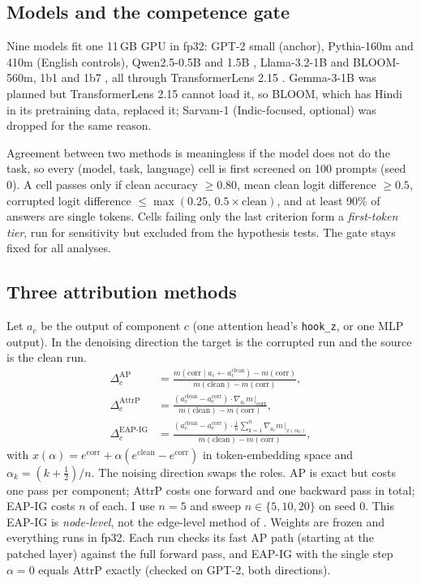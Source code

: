 \documentclass[10pt,a4paper]{article}
\newcommand{\AP}{\mathrm{AP}}
\newcommand{\AttrP}{\mathrm{AttrP}}
\begin{document}
\subsection{Models and the competence gate}
Nine models fit one 11\,GB GPU in fp32: GPT-2 small (anchor), Pythia-160m and 410m \citep{biderman2023pythia} (English controls), Qwen2.5-0.5B and 1.5B \citep{qwen2024qwen25}, Llama-3.2-1B \citep{llama2024herd} and BLOOM-560m, 1b1 and 1b7 \citep{workshop2022bloom}, all through TransformerLens 2.15 \citep{nanda2022transformerlens}. Gemma-3-1B was planned but TransformerLens 2.15 cannot load it, so BLOOM, which has Hindi in its pretraining data, replaced it; Sarvam-1 (Indic-focused, optional) was dropped for the same reason.

Agreement between two methods is meaningless if the model does not do the task, so every (model, task, language) cell is first screened on 100 prompts (seed 0). A cell passes only if clean accuracy $\ge0.80$, mean clean logit difference $\ge0.5$, corrupted logit difference $\le\max(0.25,\,0.5\times\text{clean})$, and at least 90\% of answers are single tokens. Cells failing only the last criterion form a \emph{first-token tier}, run for sensitivity but excluded from the hypothesis tests. The gate stays fixed for all analyses.

\subsection{Three attribution methods}
Let $a_c$ be the output of component $c$ (one attention head's \texttt{hook\_z}, or one MLP output). In the denoising direction the target is the corrupted run and the source is the clean run.
\begin{align}
\Delta_c^{\AP} &= \frac{m(\text{corr}\mid a_c\leftarrow a_c^{\text{clean}})-m(\text{corr})}{m(\text{clean})-m(\text{corr})},\\
\Delta_c^{\AttrP} &= \frac{(a_c^{\text{clean}}-a_c^{\text{corr}})\cdot\nabla_{a_c}m\,\big|_{\text{corr}}}{m(\text{clean})-m(\text{corr})},\\
\Delta_c^{\text{EAP-IG}} &= \frac{(a_c^{\text{clean}}-a_c^{\text{corr}})\cdot\frac1n\sum_{k=1}^{n}\nabla_{a_c}m\,\big|_{x(\alpha_k)}}{m(\text{clean})-m(\text{corr})},
\end{align}
with $x(\alpha)=e^{\text{corr}}+\alpha(e^{\text{clean}}-e^{\text{corr}})$ in token-embedding space and $\alpha_k=(k+\tfrac12)/n$. The noising direction swaps the roles. AP is exact but costs one pass per component; AttrP costs one forward and one backward pass in total; EAP-IG costs $n$ of each. I use $n=5$ and sweep $n\in\{5,10,20\}$ on seed 0. This EAP-IG is \emph{node-level}, not the edge-level method of \citet{hanna2024faith}. Weights are frozen and everything runs in fp32. Each run checks its fast AP path (starting at the patched layer) against the full forward pass, and EAP-IG with the single step $\alpha=0$ equals AttrP exactly (checked on GPT-2, both directions).
\end{document}
